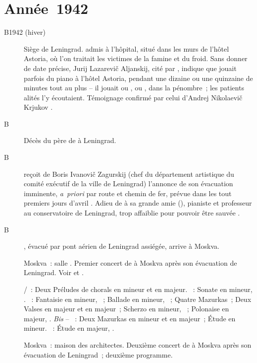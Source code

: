 \section{Année~1942}

\begin{description}
 \item[B1942 (hiver)]
 Siège de Leningrad.
 \VSofronitsky{} admis à l'hôpital, situé dans les murs de l'hôtel Astoria,
 où l'on traitait les victimes de la famine et du froid.
 Sans donner de date précise, Jurij Lazarevič Aljanskij, cité par
 \citet[p.~204]{Sofronitsky13b}, indique que \VSofronitsky{} jouait parfois
 du piano à l'hôtel Astoria, pendant une dizaine ou une quinzaine de minutes
 tout au plus -- il jouait \Scriabine{} ou \Rachmaninov{}, \Liszt{} ou
 \Chopin{}, dans la pénombre~; les patients alités l'y écoutaient.
 Témoignage confirmé par celui d'\hbox{Andrej} Nikolaevič Krjukov
 \citep[voir][p.~204]{Sofronitsky13b}.
 \item[B]
 Décès du père de \VSofronitsky{} à Leningrad.
 \item[B]
 \VSofronitsky{} reçoit de Boris Ivanovič Zagurskij (chef du département
 artistique du comité exécutif de la ville de Leningrad) l'annonce de son
 évacuation imminente, \emph{a~priori} par route et chemin de fer, prévue
 dans les tout premiers jours d'avril \citep[p.~165]{Nekrasova08}.
 Adieu de \VSofronitsky{} à sa grande amie \EDaugovet{}
 (), pianiste et professeur au conservatoire de Leningrad,
 trop affaiblie pour pouvoir être sauvée \citep[p.~165-166]{Nekrasova08}.
 \item[B]
 \VSofronitsky{}, évacué par pont aérien de Leningrad assiégée, arrive à
 Moskva.
 \item[]
 Moskva~: salle \Tchaikovski{}.
 Premier concert de \VSofronitsky{} à Moskva après son évacuation de
 Leningrad.
 Voir \citet[p.~301]{Zhukova82} et \citet[p.~216]{Zhukova08}.

 \textsc{\JBach{}/\Busoni{}}~: Deux Préludes de chorals en \kG mineur et en
 \kG majeur.
 \textsc{\Beethoven{}}~: Sonate en \kF mineur, .
 \textsc{\Chopin{}}~: Fantaisie en \kF mineur, ~; Ballade en \kG
 mineur, ~; Quatre Mazurkas~; Deux Valses en \kD \Flat majeur et en
 \kG \Flat majeur~; Scherzo en \kB mineur, ~; Polonaise en \kA
 \Flat majeur, .
 \emph{Bis} -- \textsc{\Chopin{}}~: Deux Mazurkas en \kC \Sharp mineur et en
 \kD \Flat majeur~; Étude en \kC \Sharp mineur.
 \textsc{\Scriabine{}}~: Étude en \kD \Flat majeur,  .
 \item[]
 Moskva~: maison des architectes.
 Deuxième concert de \VSofronitsky{} à Moskva après son évacuation de
 Leningrad~; deuxième programme.


\end{description}
